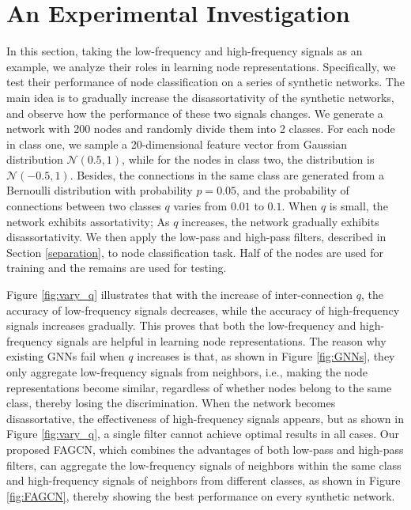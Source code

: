 \documentclass[letterpaper]{article} %
\begin{document}
\section{An Experimental Investigation}
\label{case}

In this section, taking the low-frequency and high-frequency signals as an example, we analyze their roles in learning node representations. Specifically, we test their performance of node classification on a series of synthetic networks.
The main idea is to gradually increase the disassortativity of the synthetic networks, and observe how the performance of these two signals changes.
We generate a network with 200 nodes and randomly divide them into 2 classes.
For each node in class one, we sample a 20-dimensional feature vector from Gaussian distribution $\mathcal{N}(0.5,1)$, while for the nodes in class two, the distribution is $\mathcal{N}(-0.5,1)$.
Besides, the connections in the same class are generated from a Bernoulli distribution with probability $p=0.05$, and the probability of connections between two classes $q$ varies from $0.01$ to $0.1$. When $q$ is small, the network exhibits assortativity; As $q$ increases, the network gradually exhibits disassortativity.
We then apply the low-pass and high-pass filters, described in Section \ref{separation}, to node classification task. Half of the nodes are used for training and the remains are used for testing.

Figure \ref{fig:vary_q} illustrates that with the increase of inter-connection $q$, the accuracy of low-frequency signals decreases, while the accuracy of high-frequency signals increases gradually.
This proves that both the low-frequency and high-frequency signals are helpful in learning node representations.
The reason why existing GNNs fail when $q$ increases is that, as shown in Figure \ref{fig:GNNs}, they only aggregate low-frequency signals from neighbors, i.e., making the node representations become similar, regardless of whether nodes belong to the same class, thereby losing the discrimination. 
When the network becomes disassortative, the effectiveness of high-frequency signals appears, but as shown in Figure \ref{fig:vary_q}, a single filter cannot achieve optimal results in all cases. Our proposed FAGCN, which combines the advantages of both low-pass and high-pass filters, can aggregate the low-frequency signals of neighbors within the same class and high-frequency signals of neighbors from different classes, as shown in Figure \ref{fig:FAGCN}, thereby showing the best performance on every synthetic network.
\end{document}
